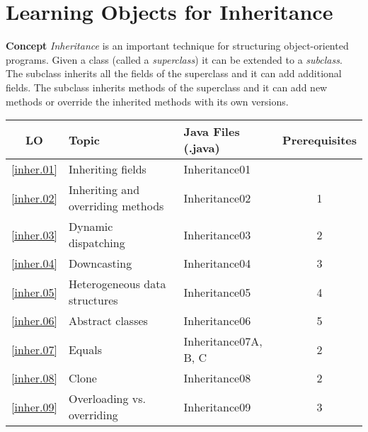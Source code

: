 \section{Learning Objects for Inheritance}\label{s.inheritance}

\textbf{Concept} \emph{Inheritance} is an important technique for 
structuring object-oriented programs. Given a class (called a 
\emph{superclass}) it can be extended to a \emph{subclass}. The 
subclass inherits all the fields of the superclass and it can add 
additional fields. The subclass inherits methods of the superclass and it can 
add new methods or override the inherited methods with its own versions.

\begin{center}
\begin{tabular}{|c|l|l|c|}
\hline
LO & Topic  & Java Files (.java) & Prerequisites \\\hline
\ref{inher.01} &  Inheriting fields                 & Inheritance01 &\\\hline
\ref{inher.02} &  Inheriting and overriding methods & Inheritance02  & 1\\\hline
\ref{inher.03} &  Dynamic dispatching             & Inheritance03  &  2\\\hline 
\ref{inher.04} &  Downcasting                     & Inheritance04  &  3\\\hline
\ref{inher.05} &  Heterogeneous data structures   & Inheritance05  &  4\\\hline
\ref{inher.06} &  Abstract classes                & Inheritance06  &  5\\\hline
\ref{inher.07} &  Equals                          & Inheritance07A, B, C  &  2\\\hline
\ref{inher.08} &  Clone                           & Inheritance08  &  2\\\hline
\ref{inher.09} &  Overloading vs. overriding      & Inheritance09  &  3\\\hline
\end{tabular}
\end{center}

